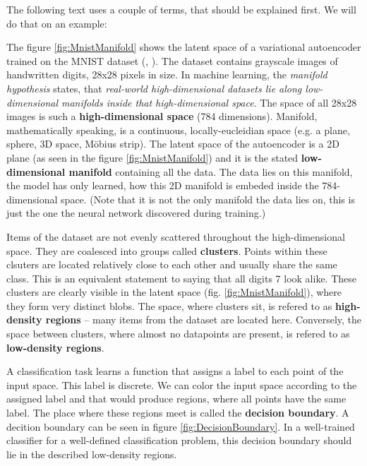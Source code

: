 \qquad

The following text uses a couple of terms, that should be explained first. We will do that on an example:

The figure \ref{fig:MnistManifold} shows the latent space of a variational autoencoder trained on the MNIST dataset (\cite{VariationalAutoencoder}, \cite{Mnist}). The dataset contains grayscale images of handwritten digits, 28x28 pixels in size. In machine learning, the \emph{manifold hypothesis} states, that \emph{real-world high-dimensional datasets lie along low-dimensional manifolds inside that high-dimensional space}. The space of all 28x28 images is such a \textbf{high-dimensional space} (784 dimensions). Manifold, mathematically speaking, is a continuous, locally-eucleidian space (e.g. a plane, sphere, 3D space, Möbius strip). The latent space of the autoencoder is a 2D plane (as seen in the figure \ref{fig:MnistManifold}) and it is the stated \textbf{low-dimensional manifold} containing all the data. The data lies on this manifold, the model has only learned, how this 2D manifold is embeded inside the 784-dimensional space. (Note that it is not the only manifold the data lies on, this is just the one the neural network discovered during training.)

Items of the dataset are not evenly scattered throughout the high-dimensional space. They are coalesced into groups called \textbf{clusters}. Points within these clsuters are located relatively close to each other and usually share the same class. This is an equivalent statement to saying that all digits 7 look alike. These clusters are clearly visible in the latent space (fig. \ref{fig:MnistManifold}), where they form very distinct blobs. The space, where clusters sit, is refered to as \textbf{high-density regions} -- many items from the dataset are located here. Conversely, the space between clusters, where almost no datapoints are present, is refered to as \textbf{low-density regions}.

A classification task learns a function that assigns a label to each point of the input space. This label is discrete. We can color the input space according to the assigned label and that would produce regions, where all points have the same label. The place where these regions meet is called the \textbf{decision boundary}. A decition boundary can be seen in figure \ref{fig:DecisionBoundary}. In a well-trained classifier for a well-defined classification problem, this decision boundary should lie in the described low-density regions.


